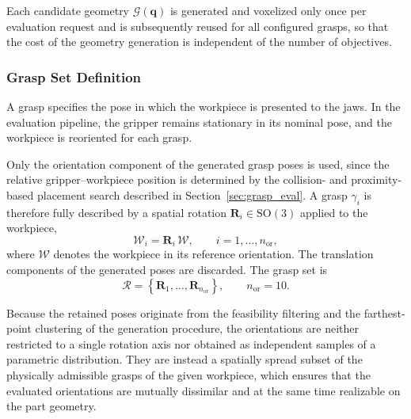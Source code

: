 Each candidate geometry $\mathcal{G}(\mathbf{q})$ is generated and voxelized only once per
evaluation request and is subsequently reused for all configured grasps, so that the cost of the
geometry generation is independent of the number of objectives.

\subsubsection{Grasp Set Definition}
\label{sec:grasp_set}

A grasp specifies the pose in which the workpiece is presented to the jaws. In the evaluation
pipeline, the gripper remains stationary in its nominal pose, and the workpiece is reoriented for
each grasp.

Only the orientation component of the generated grasp poses is used, since the relative
gripper--workpiece position is determined by the collision- and proximity-based placement search
described in Section~\ref{sec:grasp_eval}. A grasp $\gamma_i$ is therefore fully described by a
spatial rotation $\mathbf{R}_i \in \mathrm{SO}(3)$ applied to the workpiece,
\begin{equation}
    \mathcal{W}_i = \mathbf{R}_i\,\mathcal{W},
    \qquad
    i = 1,\ldots,n_{\mathrm{or}},
\end{equation}
where $\mathcal{W}$ denotes the workpiece in its reference orientation. The translation components
of the generated poses are discarded. The grasp set is
\begin{equation}
    \mathcal{R}
    =
    \left\{
        \mathbf{R}_1,\ldots,\mathbf{R}_{n_{\mathrm{or}}}
    \right\},
    \qquad
    n_{\mathrm{or}} = 10 .
\end{equation}

Because the retained poses originate from the feasibility filtering and the farthest-point
clustering of the generation procedure, the orientations are neither restricted to a single rotation
axis nor obtained as independent samples of a parametric distribution. They are instead a spatially
spread subset of the physically admissible grasps of the given workpiece, which ensures that the
evaluated orientations are mutually dissimilar and at the same time realizable on the part geometry.


